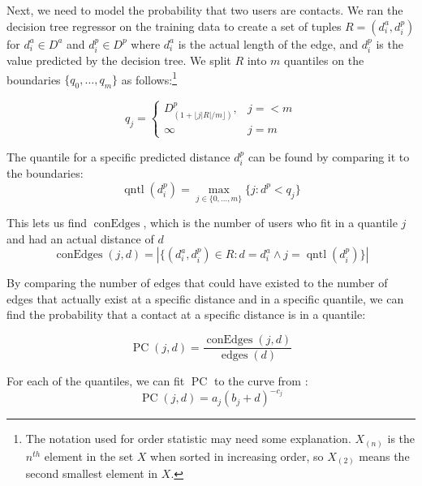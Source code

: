\documentclass[letterpaper]{article}
\DeclareMathOperator{\pContact}{PC}
\DeclareMathOperator{\edges}{edges}
\DeclareMathOperator{\contactEdges}{conEdges}
\DeclareMathOperator{\quantile}{qntl}
\begin{document}

Next, we need to model the probability that two users are contacts.
%
We ran the decision tree regressor on the training data to create a set of
tuples $R = (d^a_i, d^p_i)$ for $d^a_i \in D^a$ and $d^p_i \in D^p$ where
$d^a_i$ is the actual length of the edge, and $d^p_i$ is the value predicted by
the decision tree.
%
We split $R$ into $m$ quantiles on the boundaries $\{q_0,\dots,q_m\}$ as
follows:\footnote{The notation used for order statistic may need some
explanation.  $X_{(n)}$ is the $n^{th}$ element in the set $X$ when sorted in
increasing order, so $X_{(2)}$ means the second smallest element in $X$.}

\[
    q_j =
    \begin{cases}
        D^p_{(1+\lfloor j|R|/m \rfloor)}, & j=<m \\
        \infty & j=m
    \end{cases}
\]


The quantile for a specific predicted distance $d^p_i$ can be found by
comparing it to the boundaries:
\[
    \quantile(d^p_i) = \max_{j \in \{0,\dots,m\}} \{j: d^p<q_j\}
\]

This lets us find $\contactEdges$, which is the number of users who fit in a
quantile $j$ and had an actual distance of $d$
\[
    \contactEdges(j,d) = |\{
            (d^a_i,d^p_i) \in R :
            d=d^a_i \wedge j=\quantile(d^p_i)
        \}|
\]

By comparing the number of edges that could have existed to the number of edges
that actually exist at a specific distance and in a specific quantile, we can
find the probability that a contact at a specific distance is in a quantile:

\[
\pContact(j,d) = \frac{\contactEdges(j,d)}{\edges(d)}
\]

For each of the quantiles, we can fit $\pContact$ to the curve from
\cite{backstrom2010find}:
\[
    \pContact(j,d) = a_{j} (b_{j}+d)^{-c_{j}}
\]
\end{document}
